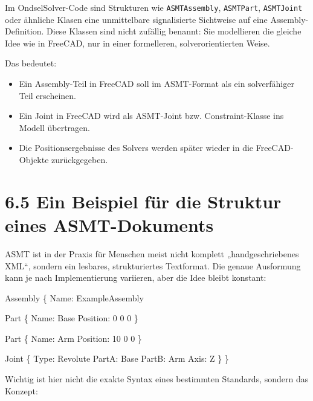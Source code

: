 \documentclass[
  12pt
]{book}
\newenvironment{Shaded}{}{}
\newcommand{\NormalTok}[1]{#1}
\providecommand{\tightlist}{%
  \setlength{\itemsep}{0pt}\setlength{\parskip}{0pt}}
\begin{document}
Im OndselSolver-Code sind Strukturen wie \texttt{ASMTAssembly},
\texttt{ASMTPart}, \texttt{ASMTJoint} oder ähnliche Klasen eine
unmittelbare signalisierte Sichtweise auf eine Assembly-Definition.
Diese Klassen sind nicht zufällig benannt: Sie modellieren die gleiche
Idee wie in FreeCAD, nur in einer formelleren, solverorientierten Weise.

Das bedeutet:

\begin{itemize}
\tightlist
\item
  Ein Assembly-Teil in FreeCAD soll im ASMT-Format als ein solverfähiger
  Teil erscheinen.
\item
  Ein Joint in FreeCAD wird als ASMT-Joint bzw. Constraint-Klasse ins
  Modell übertragen.
\item
  Die Positionsergebnisse des Solvers werden später wieder in die
  FreeCAD-Objekte zurückgegeben.
\end{itemize}

\hypertarget{ein-beispiel-fuxfcr-die-struktur-eines-asmt-dokuments}{%
\section{\texorpdfstring{{6.5} Ein Beispiel für die Struktur eines
ASMT-Dokuments}{6.5 Ein Beispiel für die Struktur eines ASMT-Dokuments}}\label{ein-beispiel-fuxfcr-die-struktur-eines-asmt-dokuments}}

ASMT ist in der Praxis für Menschen meist nicht komplett
„handgeschriebenes XML``, sondern ein lesbares, strukturiertes
Textformat. Die genaue Ausformung kann je nach Implementierung
variieren, aber die Idee bleibt konstant:

\begin{Shaded}
\begin{Highlighting}[]
\NormalTok{Assembly \{}
\NormalTok{  Name: ExampleAssembly}

\NormalTok{  Part \{}
\NormalTok{    Name: Base}
\NormalTok{    Position: 0 0 0}
\NormalTok{  \}}

\NormalTok{  Part \{}
\NormalTok{    Name: Arm}
\NormalTok{    Position: 10 0 0}
\NormalTok{  \}}

\NormalTok{  Joint \{}
\NormalTok{    Type: Revolute}
\NormalTok{    PartA: Base}
\NormalTok{    PartB: Arm}
\NormalTok{    Axis: Z}
\NormalTok{  \}}
\NormalTok{\}}
\end{Highlighting}
\end{Shaded}

Wichtig ist hier nicht die exakte Syntax eines bestimmten Standards,
sondern das Konzept:
\end{document}

